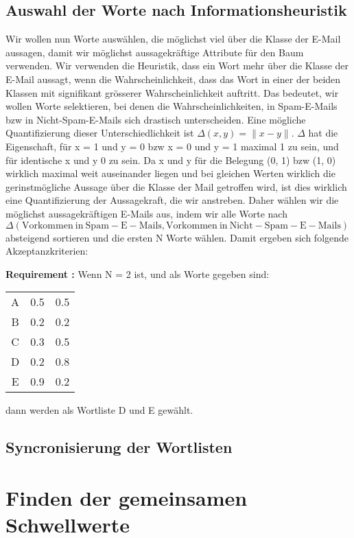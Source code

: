 \documentclass{article}
\newcounter{requirementscount}{}
\newcommand{\requirement}[1] {
        \addtocounter{requirementscount}{1}
        {\bf Requirement \therequirementscount:} #1\\
    }
\begin{document}
\subsection{Auswahl der Worte nach Informationsheuristik}
Wir wollen nun Worte ausw\"ahlen, die m\"oglichst viel \"uber die Klasse
der E-Mail aussagen, damit wir m\"oglichst aussagekr\"aftige Attribute
f\"ur den Baum verwenden. Wir verwenden die Heuristik, dass ein Wort
mehr \"uber die Klasse der E-Mail aussagt, wenn die Wahrscheinlichkeit,
dass das Wort in einer der beiden Klassen mit signifikant gr\"osserer
Wahrscheinlichkeit auftritt. Das bedeutet, wir wollen Worte selektieren,
bei denen die Wahrscheinlichkeiten, in Spam-E-Mails bzw in Nicht-Spam-E-Mails
sich drastisch unterscheiden. Eine m\"ogliche Quantifizierung dieser 
Unterschiedlichkeit ist \(\Delta(x, y) = \|x - y\|\). \(\Delta\) hat die
Eigenschaft, f\"ur x = 1 und y = 0 bzw x = 0 und y = 1 maximal 1 zu sein,
und f\"ur identische x und y 0 zu sein. Da x und y f\"ur die Belegung
(0, 1) bzw (1, 0) wirklich maximal weit auseinander liegen und bei 
gleichen Werten wirklich die gerinstm\"ogliche Aussage \"uber die Klasse
der Mail getroffen wird, ist dies wirklich eine Quantifizierung der
Aussagekraft, die wir anstreben. Daher w\"ahlen wir die m\"oglichst
aussagekr\"aftigen E-Mails aus, indem wir alle Worte nach 
\(\Delta(\mathrm{Vorkommen~in~Spam-E-Mails}, 
         \mathrm{Vorkommen~in~Nicht-Spam-E-Mails})\) 
absteigend sortieren und die ersten N Worte w\"ahlen. Damit ergeben
sich folgende Akzeptanzkriterien:\\
\requirement{Wenn N = 2 ist, und als Worte gegeben sind:
\begin{tabular}{c c c}
A & 0.5 & 0.5 \\
B & 0.2 & 0.2 \\
C & 0.3 & 0.5 \\
D & 0.2 & 0.8 \\
E & 0.9 & 0.2
\end{tabular}
dann werden als Wortliste D und E gew\"ahlt.}

\subsection{Syncronisierung der Wortlisten}

\pagebreak %
\section{Finden der gemeinsamen Schwellwerte}
\end{document}
